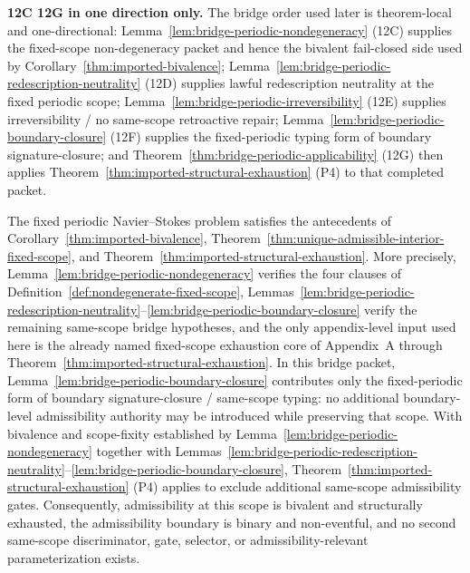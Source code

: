 \begin{tcolorbox}[title={Bridge order for the fixed periodic packet}, colback=blue!2!white, colframe=blue!55!black]
\textbf{12C \textrightarrow{} 12G in one direction only.} The bridge order used later is theorem-local and one-directional: Lemma~\ref{lem:bridge-periodic-nondegeneracy} (12C) supplies the fixed-scope non-degeneracy packet and hence the bivalent fail-closed side used by Corollary~\ref{thm:imported-bivalence}; Lemma~\ref{lem:bridge-periodic-redescription-neutrality} (12D) supplies lawful redescription neutrality at the fixed periodic scope; Lemma~\ref{lem:bridge-periodic-irreversibility} (12E) supplies irreversibility / no same-scope retroactive repair; Lemma~\ref{lem:bridge-periodic-boundary-closure} (12F) supplies the fixed-periodic typing form of boundary signature-closure; and Theorem~\ref{thm:bridge-periodic-applicability} (12G) then applies Theorem~\ref{thm:imported-structural-exhaustion} (P4) to that completed packet.
\end{tcolorbox}

\begin{manualtheorem}
\label{thm:bridge-periodic-applicability}
The fixed periodic Navier--Stokes problem satisfies the antecedents of Corollary~\ref{thm:imported-bivalence}, Theorem~\ref{thm:unique-admissible-interior-fixed-scope}, and Theorem~\ref{thm:imported-structural-exhaustion}. More precisely, Lemma~\ref{lem:bridge-periodic-nondegeneracy} verifies the four clauses of Definition~\ref{def:nondegenerate-fixed-scope}, Lemmas~\ref{lem:bridge-periodic-redescription-neutrality}--\ref{lem:bridge-periodic-boundary-closure} verify the remaining same-scope bridge hypotheses, and the only appendix-level input used here is the already named fixed-scope exhaustion core of Appendix~A through Theorem~\ref{thm:imported-structural-exhaustion}. In this bridge packet, Lemma~\ref{lem:bridge-periodic-boundary-closure} contributes only the fixed-periodic form of boundary signature-closure / same-scope typing: no additional boundary-level admissibility authority may be introduced while preserving that scope. With bivalence and scope-fixity established by Lemma~\ref{lem:bridge-periodic-nondegeneracy} together with Lemmas~\ref{lem:bridge-periodic-redescription-neutrality}--\ref{lem:bridge-periodic-boundary-closure}, Theorem~\ref{thm:imported-structural-exhaustion} (P4) applies to exclude additional same-scope admissibility gates. Consequently, admissibility at this scope is bivalent and structurally exhausted, the admissibility boundary is binary and non-eventful, and no second same-scope discriminator, gate, selector, or admissibility-relevant parameterization exists.
\end{manualtheorem}

